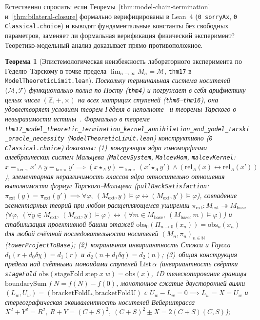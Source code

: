 \documentclass[11pt,a4paper]{article}
\newtheorem{theorem}{Теорема}[section]
\theoremstyle{definition}
\theoremstyle{remark}
\begin{document}
Естественно спросить: если Теоремы~\ref{thm:model-chain-termination} и~\ref{thm:bilateral-closure} формально верифицированы в Lean~4 (\texttt{0 sorryAx}, \texttt{0 Classical.choice}) и выводят фундаментальные константы без свободных параметров, заменяет ли формальная верификация физический эксперимент? Теоретико-модельный анализ доказывает прямо противоположное.

\begin{theorem}[Эпистемологическая неизбежность лабораторного эксперимента по Гёделю--Тарскому в точке предела $\lim_{n\to\infty} M_n = \mathcal{M}$, \texttt{thm17} в \texttt{ModelTheoreticLimit.lean}]
\label{thm:godel-tarski-experiment}
Поскольку терминальная система носителей $\langle\mathcal{M},\mathcal{T}\rangle$ функционально полна по Посту (\texttt{thm4}) и погружает в себя арифметику целых чисел $(\mathbb{Z},+,\times)$ на всех матрицах ступеней (\texttt{thm6}--\texttt{thm16}), она удовлетворяет условиям теорем Гёделя о неполноте~\cite{Godel1931} и теоремы Тарского о невыразимости истины~\cite{Tarski1936}. Формально в теореме \texttt{thm17\_model\_theoretic\_termination\_kernel\_annihilation\_and\_godel\_tarski\_oracle\_necessity} (\texttt{ModelTheoreticLimit.lean}) конструктивно (\texttt{0 Classical.choice}) доказаны:
(1)~конгруэнция ядра гомоморфизма алгебраических систем Мальцева (\texttt{MalcevSystem}, \texttt{MalcevHom}, \texttt{malcevKernel}: $x\equiv_{\ker\pi} x'\land y\equiv_{\ker\pi} y'\implies (x\star_A y)\equiv_{\ker\pi}(x'\star_A y')\land (\mathrm{rel}_A(x)\leftrightarrow\mathrm{rel}_A(x'))$), элементарная неразличимость классов ядра относительно отношения выполнимости формул Тарского--Мальцева (\texttt{pullBackSatisfaction}: $\pi_{\mathrm{ext}}(y)=\pi_{\mathrm{ext}}(y')\implies \forall\varphi,\ (M_{\mathrm{ext}},y)\models\varphi\leftrightarrow(M_{\mathrm{ext}},y')\models\varphi$), совпадение элементарных теорий при любом расщепляющемся уширении $\pi_{\mathrm{ext}} : M_{\mathrm{ext}}\twoheadrightarrow M_{\mathrm{base}}$ ($\forall\varphi,\ (\forall y\in M_{\mathrm{ext}},\ (M_{\mathrm{ext}},y)\models\varphi)\leftrightarrow(\forall m\in M_{\mathrm{base}},\ (M_{\mathrm{base}},m)\models\varphi)$) и стабилизация проективной башни этажей $\mathrm{obs}_0(\Pi_{n\to 0}(x_n)) = \mathrm{obs}_n(x_n)$ для любой счётной последовательности носителей $(M_n,\pi_n)_{n\in\mathbb{N}}$ (\texttt{towerProjectToBase});
(2)~кограничная инвариантность Стокса и Гаусса $d_1(r+d_0\delta\chi)=d_1(r)$ и $d_2(n+d_1\delta q)=d_2(n)$;
(3)~общая конструкция предела над счётными моноидами ступеней $\mathrm{List}\,\alpha$ (инвариантность свёртки \texttt{stageFold} $\mathrm{obs}(\mathrm{stageFold}\;\mathrm{step}\;x\;w)=\mathrm{obs}(x)$, 1D телескопирование границы $\mathrm{boundarySum}\;f\;N = f(N)-f(0)$, монотонное сжатие двусторонней вилки $(L_w,U_w) = (\mathrm{bracketFoldL},\mathrm{bracketFoldU})$ с $U_w-L_w=0\implies L_w=X=U_w$ и стереографическая эквивалентность носителей Вейерштрасса $X^2+Y^2=R^2,\ R+Y=(C+S)^2,\ (C+S)^2\pm X = 2(C+S)(C,S)$);

\end{theorem}
\end{document}
